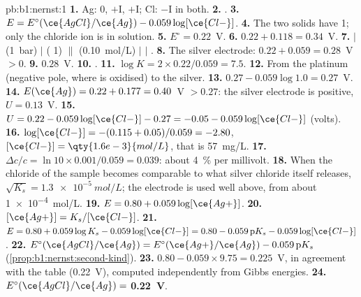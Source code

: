 \begin{solution}{pb:b1:nernst:1}
\textbf{1.} Ag: 0, $+$I, $+$I; Cl: $-$I in both.
\textbf{2.} .
\textbf{3.} $E = E^\circ(\ce{AgCl}/\ce{Ag}) - 0.059\log[\ce{Cl-}]$.
\textbf{4.} The two solids have  1; only the chloride ion is in
solution.
\textbf{5.} $E^\circ = 0.22$~V.
\textbf{6.} $0.22 + 0.118 = 0.34$~V.
\textbf{7.}  $|$  (\qty{1}{bar}) $|$  ( 1)
$\|$  (\qty{0.10}{mol/L}) $|$  $|$ .
\textbf{8.} The silver electrode: $0.22 + 0.059 = 0.28$~V $> 0$.
\textbf{9.} $0.28$~V.
\textbf{10.} .
\textbf{11.} $\log K = 2 \times 0.22/0.059 = 7.5$.
\textbf{12.} From the platinum (negative pole, where  is oxidised)
to the silver.
\textbf{13.} $0.27 - 0.059\log 1.0 = 0.27$~V.
\textbf{14.} $E(\ce{Ag}) = 0.22 + 0.177 = 0.40$~V $> 0.27$: the silver
electrode is positive, $U = 0.13$~V.
\textbf{15.} $U = 0.22 - 0.059\log[\ce{Cl-}] - 0.27 = -0.05 -
0.059\log[\ce{Cl-}]$ (volts).
\textbf{16.} $\log[\ce{Cl-}] = -(0.115 + 0.05)/0.059 = -2.80$,
$[\ce{Cl-}] = \qty{1.6e-3}{mol/L}$, that is \qty{57}{mg/L}.
\textbf{17.} $\Delta c/c = \ln 10 \times 0.001/0.059 = 0.039$: about
\qty{4}{\percent} per millivolt.
\textbf{18.} When the chloride of the sample becomes comparable to what
silver chloride itself releases, $\sqrt{K_s} = \qty{1.3e-5}{mol/L}$;
the electrode is used well above, from about \qty{1e-4}{mol/L}.
\textbf{19.} $E = 0.80 + 0.059\log[\ce{Ag+}]$.
\textbf{20.} $[\ce{Ag+}] = K_s/[\ce{Cl-}]$.
\textbf{21.} $E = 0.80 + 0.059\log K_s - 0.059\log[\ce{Cl-}] = 0.80 -
0.059\,\mathrm{p}K_s - 0.059\log[\ce{Cl-}]$.
\textbf{22.} $E^\circ(\ce{AgCl}/\ce{Ag}) = E^\circ(\ce{Ag+}/\ce{Ag}) -
0.059\,\mathrm{p}K_s$ (\cref{prop:b1:nernst:second-kind}).
\textbf{23.} $0.80 - 0.059 \times 9.75 = 0.225$~V, in agreement with the
table (0.22~V), computed independently from Gibbs energies.
\textbf{24.} $E^\circ(\ce{AgCl}/\ce{Ag}) = $ \textbf{0.22~V}.
\end{solution}

